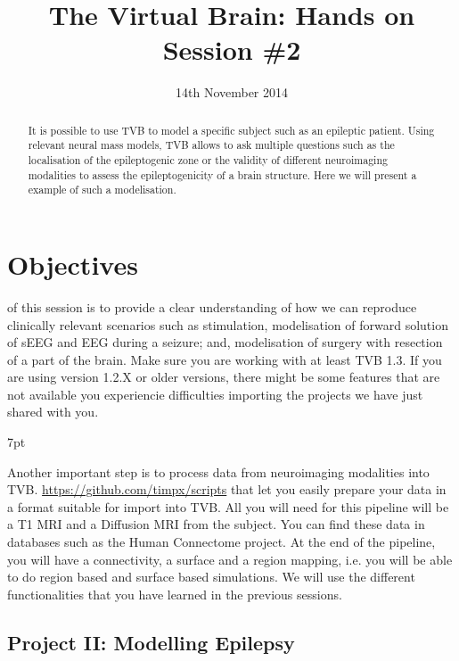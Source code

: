 \documentclass{tufte-handout}
\title{The Virtual Brain: Hands on Session \#2}
\date{14th November 2014}
\newenvironment{blah}{%
  \def\FrameCommand{%
    \hspace{1pt}%
    {\color{DarkOrange}\vrule width 2pt}%
    {\color{PeachPuff}\vrule width 4pt}%
    \colorbox{PeachPuff}%
  }%
  \MakeFramed{\advance\hsize-\width\FrameRestore}%
  \noindent\hspace{-4.55pt}%
  \begin{adjustwidth}{}{7pt}%
  \vspace{2pt}\vspace{2pt}%
}
{%
  \vspace{2pt}\end{adjustwidth}\endMakeFramed%
}
\begin{document}

\newpage
\ClearWallPaper


\begin{abstract}
\noindent 
It is possible to use TVB to model a specific subject such as an epileptic
patient. Using relevant neural mass models, TVB allows to ask multiple
questions such as the localisation of the epileptogenic zone or the validity
of different neuroimaging modalities to assess the epileptogenicity of a brain
structure. Here we will present a example of such a modelisation.
\end{abstract}

 

\section{Objectives}\label{sec:objectives}
of this session is to provide a clear understanding of how we can reproduce
clinically relevant scenarios such as stimulation, modelisation of forward
solution of sEEG and EEG during a seizure; and, modelisation of surgery with
resection of a part of the brain. Make sure you are working with at least TVB
1.3. If you are using version 1.2.X or older versions, there might be some
features that are not available you experiencie difficulties importing the
projects we have just shared with you.

\begin{blah}
Another important step is to process data from neuroimaging modalities into
TVB. \href{There is a pipeline written by Timothée
Proix}{https://github.com/timpx/scripts} that let you easily prepare your data
in a format suitable for import into TVB. All you will need for this pipeline
will be a T1 MRI and a Diffusion MRI from the subject. You can find these data
in databases such as the Human Connectome project. At the end of the pipeline,
you will have a connectivity, a surface and a region mapping, i.e. you will be
able to do region based and surface based simulations. We will use the
different functionalities that you have learned in the previous sessions.
\end{blah}

\subsection{Project II: Modelling Epilepsy}\label{sec:project_data}
\end{document}
